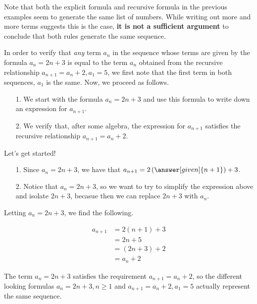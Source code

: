 \documentclass{ximera}
\begin{document}
\begin{example}



Note that both the explicit formula and recursive formula in the previous examples seem to generate the same list of numbers.  While writing out more and more terms suggests this is the case, \textbf{\textcolor{red!80!black}{it is not a sufficient argument}} to conclude that both rules generate the same sequence.  

In order to verify that \emph{any} term $a_n$ in the sequence whose terms are given by the formula $a_n = 2n+3$ is equal to the term $a_n$ obtained from the recursive relationship $a_{n+1}=a_n+2, a_1=5$, we first note that the first term in both sequences, $a_1$ is the same. Now, we proceed as follows.

\begin{itemize}
\item[1.] We start with the formula $a_n=2n+3$ and use this formula to write down an expression for $a_{n+1}$.
\item[2.] We verify that, after some algebra, the expression for $a_{n+1}$ satisfies the recursive relationship $a_{n+1} = a_n+2$.
\end{itemize}

Let's get started!

\begin{itemize}
\item[1.] Since $a_n=2n+3$, we have that $a_{n+1} = 2\left(\answer[given]{n+1}\right)+3$.
\item[2.] Notice that $a_n = 2n+3$, so we want to try to simplify the expression above and isolate $2n+3$, becasue then we can replace $2n+3$ with $a_n$. 
\end{itemize}



Letting $a_n = 2n+3$, we find the following.



\begin{align*}
a_{n+1} &= 2\left(n+1\right)+3 \\
&= 2n+5 \\
&= \left(2n+3\right) +2 \\
&= a_n+2
\end{align*}  

The term $a_n = 2n+3$ satisfies the requirement $a_{n+1}=a_n+2$, so the different looking formulas $a_n = 2n+3, n \geq 1$ and $a_{n+1}=a_n+2, a_1=5$ actually represent the same sequence.
\end{example}
\end{document}
